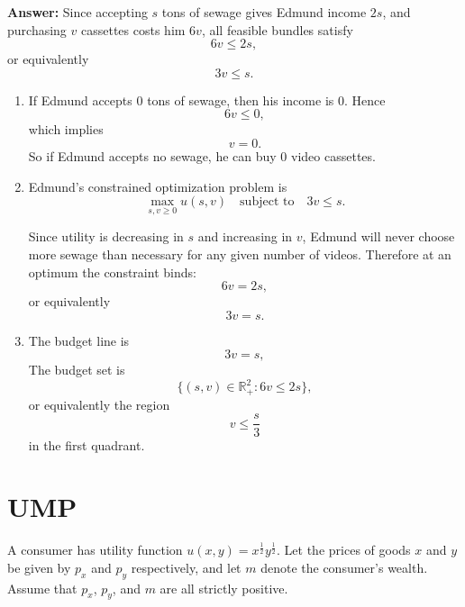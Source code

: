 \documentclass[12pt,a4paper]{article}
\begin{document}
\vspace{0.5cm}

\noindent\textbf{Answer:} Since accepting $s$ tons of sewage gives Edmund income $2s$, and purchasing $v$ cassettes costs him $6v$, all feasible bundles satisfy
\[
6v \le 2s,
\]
or equivalently
\[
3v \le s.
\]
\begin{enumerate}
  \item If Edmund accepts $0$ tons of sewage, then his income is $0$. Hence
  \[
    6v \le 0,
  \]
  which implies
  \[
    v=0.
  \]
  So if Edmund accepts no sewage, he can buy $0$ video cassettes.

  \item Edmund's constrained optimization problem is
  \[
    \max_{s,v\ge 0} u(s,v)
    \quad \text{subject to} \quad
    3v \le s.
  \]

  Since utility is decreasing in $s$ and increasing in $v$, Edmund will never choose more sewage than necessary for any given number of videos. Therefore at an optimum the constraint binds:
  \[
    6v = 2s,
  \]
  or equivalently
  \[
    3v=s.
  \]

  \item The budget line is
  \[
    3v=s,
  \]
  The budget set is
  \[
    \{(s,v)\in \mathbb{R}_+^2 : 6v \le 2s\},
  \]
  or equivalently the region
  \[
    v \le \frac{s}{3}
  \]
  in the first quadrant.
  \begin{center}
  \end{center}
\end{enumerate}

\section{UMP}
A consumer has utility function $u(x,y)=x^{\frac{1}{2}}y^{\frac{1}{2}}$. Let the prices of goods $x$ and $y$ be given by $p_x$ and $p_y$ respectively, and let $m$ denote the consumer's wealth. Assume that $p_x$, $p_y$, and $m$ are all strictly positive.
\end{document}
